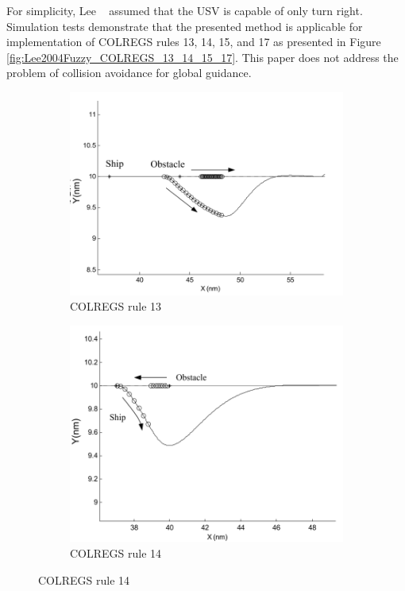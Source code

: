     For simplicity, Lee \etal~\cite{Lee2004Fuzzy} assumed that the \ac{USV} is capable of only turn right. Simulation tests demonstrate that the presented method is applicable for implementation of \ac{COLREGS} rules 13, 14, 15, and 17 as presented in Figure \ref{fig:Lee2004Fuzzy_COLREGS_13_14_15_17}. This paper does not address the problem of collision avoidance for global guidance.
    \begin{figure}[H]
    \centering
    
        \begin{subfigure}[b]{0.5\textwidth}
            \centering
            \includegraphics[width=\textwidth]{figs/Lee2004Fuzzy_COLREGS13.png}
            \caption{\ac{COLREGS} rule 13}
            \label{fig:Lee2004Fuzzy_COLREGS13}
        \end{subfigure}
        \begin{subfigure}[b]{0.45\textwidth}
            \centering
            \includegraphics[width=\textwidth]{figs/Lee2004Fuzzy_COLREGS14.png}
            \caption{\ac{COLREGS} rule 14}
            \label{fig:Lee2004Fuzzy_COLREGS14}
        \end{subfigure}
        

\end{figure}
